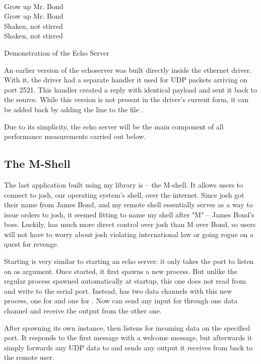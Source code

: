 \begin{code}
\begin{mdframed}[style=shell]
\\
Grow up Mr. Bond\\
Grow up Mr. Bond\\
Shaken, not stirred\\
Shaken, not stirred
\end{mdframed}
\caption{Demonstration of the Echo Server}
\end{code}
\label{enet:echodemo}

An earlier version of the echoserver was built directly inside the ethernet driver. With it, the driver had a separate handler it used for UDP packets arriving on port 2521. This handler created a reply with identical payload and sent it back to the source. While this version is not present in the driver's current form, it can be added back by adding the line  to the file .

Due to its simplicity, the echo server will be the main component of all performance measurements carried out below.

\subsection{The M-Shell}
The last application built using my  library is  -- the M-shell. It allows users to connect to josh, our operating system's shell, over the internet. Since josh got their name from James Bond, and my remote shell essentially serves as a way to issue orders to josh, it seemed fitting to name my shell after "M" -- James Bond's boss. Luckily,  has much more direct control over josh than M over Bond, so users will not have to worry about josh violating international law or going rogue on a quest for revenge.

Starting  is very similar to starting an echo server: it only takes the port to listen on as argument. Once started, it first spawns a new  process. But unlike the regular  process spawned automatically at startup, this one does not read from and write to the serial port. Instead,  has two data channels with this new process, one for  and one for . Now  can send any input for  through one data channel and receive the output from the other one.

After spawning its own  instance,  then listens for incoming data on the specified port. It responds to the first message with a welcome message, but afterwards it simply forwards any UDP data to  and sends any output it receives from  back to the remote user.

